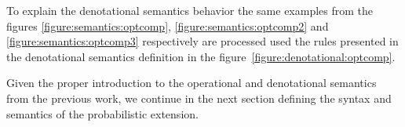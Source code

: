 To explain the denotational semantics behavior the same examples
from the figures
\ref{figure:semantics:optcomp},
\ref{figure:semantics:optcomp2} and
\ref{figure:semantics:optcomp3}
respectively
are processed used the rules presented in the denotational semantics definition
in the figure~\ref{figure:denotational:optcomp}.

Given the proper introduction to the operational and denotational semantics
from the previous work, we continue in the next section defining the syntax and semantics
of the probabilistic extension.



